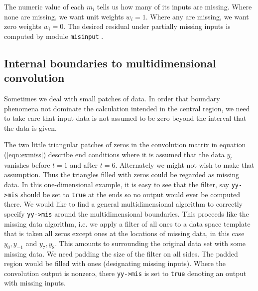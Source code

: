 \par
The numeric value of each $m_i$ tells us how many of its inputs are missing.
Where none are missing, we want unit weights $w_i=1$.
Where any are missing, we want zero weights $w_i=0$.
The desired residual under partially missing inputs is computed
by module \texttt{misinput}
.




\subsection{Internal boundaries to multidimensional convolution }

\par
Sometimes we deal with small patches of data.
In order that boundary phenomena not dominate
the calculation intended in the central region,
we need to take care that
input data is not assumed to be zero
beyond the interval that the data is given.

\par
The two little triangular patches of zeros in
the convolution matrix in equation (\ref{eqn:exmiss})
describe end conditions where it is assumed that the data $y_t$
vanishes before $t=1$ and after $t=6$.
Alternately we might not wish to make that assumption.
Thus the triangles filled with zeros could be regarded as missing data.
In this one-dimensional example,
it is easy to see that the filter, say
\verb#yy->mis#
should be set to \texttt{true} at the ends so no output
would ever be computed there.
We would like to find a general multidimensional algorithm
to correctly specify
\verb#yy->mis#
around the multidimensional boundaries.
This proceeds like the missing data algorithm,
i.e. we apply a filter of all ones to a data space template that is taken
all zeros except ones at the locations of missing data,
in this case $y_0,y_{-1}$ and $y_7,y_8$.
This amounts to surrounding the original data set with some missing data.
We need padding the size of the filter on all sides.
The padded region would be filled
with ones (designating missing inputs).
Where the convolution output is nonzero, there
\verb#yy->mis# is set to \texttt{true}
denoting an output with missing inputs.

